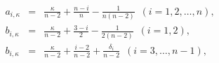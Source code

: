 \begin{equation}
\begin{array}{rcl}
a_{i,\kappa}&=&\frac{\kappa}{n-2}+\frac{n-i}{n}-\frac{1}{n(n-2)}
\,\,\, (i=1,2,\dots,n),\\
b_{i,\kappa}&=&\frac{\kappa}{n-2}+\frac{3-i}{2}-\frac{1}{2(n-2)}
\,\,\, (i=1,2),\\
b_{i,\kappa}&=&\frac{\kappa}{n-2}+\frac{i-2}{n-2}+\frac{\delta_{i}}{n-2}
\,\,\, (i=3,\dots,n-1),
\end{array}
\end{equation}

